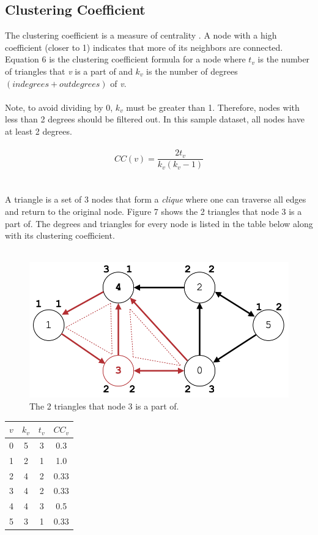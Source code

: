 \documentclass[journal]{IEEEtran}
\begin{document}
\subsection{Clustering Coefficient}
The clustering coefficient is a measure of centrality \cite{cluster}. A node with a high coefficient (closer to 1) indicates that more of its neighbors are connected. Equation 6 is the clustering coefficient formula for a node where $t_{v}$ is the number of triangles that \emph{v} is a part of and $k_{v}$ is the number of degrees $(indegrees+outdegrees)$ of \emph{v}.\\\\
Note, to avoid dividing by 0, $k_{v}$ must be greater than 1. Therefore, nodes with less than 2 degrees should be filtered out. In this sample dataset, all nodes have at least 2 degrees.\\\\
\begin{equation}
CC(v)=\frac{2t_{v}}{k_{v}(k_{v}-1)}
\end{equation}\\\\
A triangle is a set of 3 nodes that form a \emph{clique} where one can traverse all edges and return to the original node. Figure 7 shows the 2 triangles that node 3 is a part of. The degrees and triangles for every node is listed in the table below along with its clustering coefficient.\\\\
\begin{figure}[h!]
\begin{center}\includegraphics[scale=0.2]{7.png}\end{center}
\caption{The 2 triangles that node 3 is a part of.}
\end{figure}
\begin{center}
\begin{tabular}{ c c c c }
$v$ & $k_{v}$ & $t_{v}$ & $CC_{v}$\\ \hline
0 & 5 & 3 & 0.3\\
1 & 2 & 1 & 1.0\\
2 & 4 & 2 & 0.33\\
3 & 4 & 2 & 0.33\\
4 & 4 & 3 & 0.5\\
5 & 3 & 1 & 0.33\\
\end{tabular}
\end{center}
\end{document}
